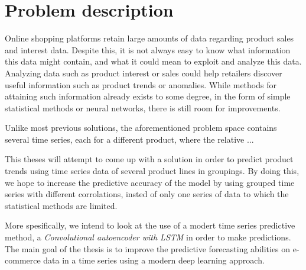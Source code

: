 
\section{Problem description} \label{into:problem-description}
Online shopping platforms retain large amounts of data regarding product sales and interest data.
Despite this, it is not always easy to know what information this data might contain, and what it could mean to exploit and analyze this data.
Analyzing data such as product interest or sales could help retailers discover useful information such as product trends or anomalies.
While methods for attaining such information already exists to some degree, in the form of simple statistical methods or neural networks,
there is still room for improvements.

Unlike most previous solutions, the aforementioned problem space contains several time series,
each for a different product, where the relative ...


This theses will attempt to come up with a solution in order to predict product trends using time series data of several product lines in groupings.
By doing this, we hope to increase the predictive accuracy of the model by using grouped time series with different corrolations,
insted of only one series of data to which the statistical methods are limited.

More spesifically, we intend to look at the use of a modert time series predictive method, a \textit{Convolutional autoencoder with LSTM} in order to make predictions.
The main goal of the thesis is to improve the predictive forecasting abilities on e-commerce data in a time series using a modern deep learning approach.